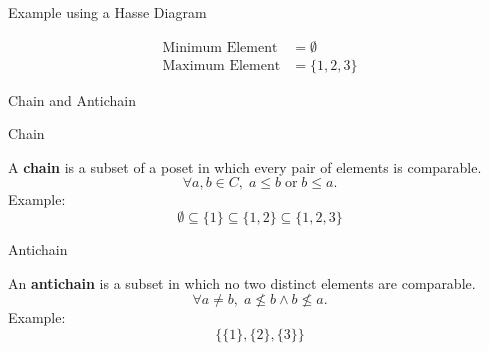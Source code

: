 \begin{frame}{Example using a Hasse Diagram}

\centering

\[
\boxed{
\begin{aligned}
\text{Minimum Element} &= \emptyset\\
\text{Maximum Element} &= \{1,2,3\}
\end{aligned}
}
\]

\end{frame}


\begin{frame}{Chain and Antichain}

\begin{block}{Chain}

A \textbf{chain} is a subset of a poset in which every pair of
elements is comparable.
\[
\forall a,b\in C,\;
a\leq b
\;\text{or}\;
b\leq a.
\]
Example:
\[
\emptyset
\subseteq
\{1\}
\subseteq
\{1,2\}
\subseteq
\{1,2,3\}
\]

\end{block}

\begin{block}{Antichain}

An \textbf{antichain} is a subset in which no two distinct
elements are comparable.
\[
\forall a\neq b,\;
a\nleq b
\land
b\nleq a.
\]
Example: 
\[
\{\{1\},\{2\},\{3\}\}
\]

\end{block}

\end{frame}